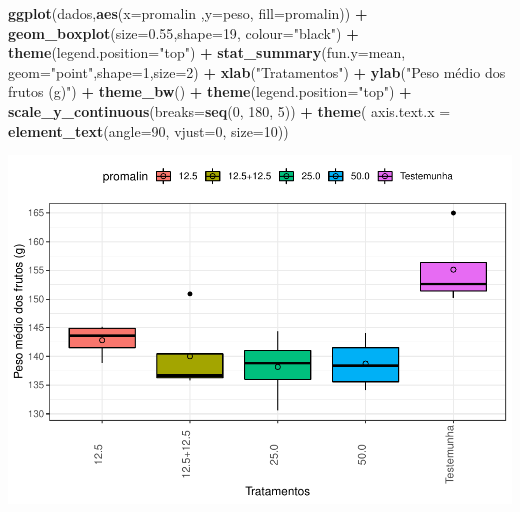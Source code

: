 \documentclass[]{book}
\newenvironment{Shaded}{\begin{snugshade}}{\end{snugshade}}
\newcommand{\DataTypeTok}[1]{\textcolor[rgb]{0.13,0.29,0.53}{#1}}
\newcommand{\DecValTok}[1]{\textcolor[rgb]{0.00,0.00,0.81}{#1}}
\newcommand{\FloatTok}[1]{\textcolor[rgb]{0.00,0.00,0.81}{#1}}
\newcommand{\KeywordTok}[1]{\textcolor[rgb]{0.13,0.29,0.53}{\textbf{#1}}}
\newcommand{\NormalTok}[1]{#1}
\newcommand{\OperatorTok}[1]{\textcolor[rgb]{0.81,0.36,0.00}{\textbf{#1}}}
\newcommand{\StringTok}[1]{\textcolor[rgb]{0.31,0.60,0.02}{#1}}
\begin{document}
\begin{Shaded}
\begin{Highlighting}[]
\KeywordTok{ggplot}\NormalTok{(dados,}\KeywordTok{aes}\NormalTok{(}\DataTypeTok{x=}\NormalTok{promalin ,}\DataTypeTok{y=}\NormalTok{peso, }\DataTypeTok{fill=}\NormalTok{promalin)) }\OperatorTok{+}\StringTok{ }
\StringTok{      }\KeywordTok{geom_boxplot}\NormalTok{(}\DataTypeTok{size=}\FloatTok{0.55}\NormalTok{,}\DataTypeTok{shape=}\DecValTok{19}\NormalTok{, }\DataTypeTok{colour=}\StringTok{"black"}\NormalTok{) }\OperatorTok{+}\StringTok{ }
\StringTok{      }\KeywordTok{theme}\NormalTok{(}\DataTypeTok{legend.position=}\StringTok{"top"}\NormalTok{) }\OperatorTok{+}\StringTok{ }
\StringTok{      }\KeywordTok{stat_summary}\NormalTok{(}\DataTypeTok{fun.y=}\NormalTok{mean, }\DataTypeTok{geom=}\StringTok{"point"}\NormalTok{,}\DataTypeTok{shape=}\DecValTok{1}\NormalTok{,}\DataTypeTok{size=}\DecValTok{2}\NormalTok{) }\OperatorTok{+}\StringTok{ }
\StringTok{      }\KeywordTok{xlab}\NormalTok{(}\StringTok{"Tratamentos"}\NormalTok{) }\OperatorTok{+}\StringTok{  }
\StringTok{      }\KeywordTok{ylab}\NormalTok{(}\StringTok{"Peso médio dos frutos (g)"}\NormalTok{)  }\OperatorTok{+}
\StringTok{      }\KeywordTok{theme_bw}\NormalTok{() }\OperatorTok{+}
\StringTok{      }\KeywordTok{theme}\NormalTok{(}\DataTypeTok{legend.position=}\StringTok{"top"}\NormalTok{) }\OperatorTok{+}
\StringTok{      }\KeywordTok{scale_y_continuous}\NormalTok{(}\DataTypeTok{breaks=}\KeywordTok{seq}\NormalTok{(}\DecValTok{0}\NormalTok{, }\DecValTok{180}\NormalTok{, }\DecValTok{5}\NormalTok{)) }\OperatorTok{+}
\StringTok{      }\KeywordTok{theme}\NormalTok{( }\DataTypeTok{axis.text.x  =} \KeywordTok{element_text}\NormalTok{(}\DataTypeTok{angle=}\DecValTok{90}\NormalTok{, }\DataTypeTok{vjust=}\DecValTok{0}\NormalTok{, }\DataTypeTok{size=}\DecValTok{10}\NormalTok{))}
\end{Highlighting}
\end{Shaded}

\includegraphics{TudodoR_files/figure-latex/unnamed-chunk-239-1.pdf}
\end{document}
